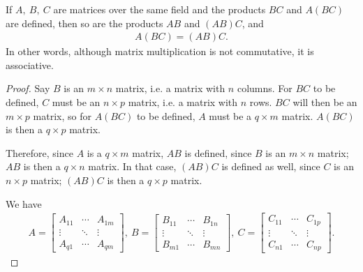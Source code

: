 \documentclass[12pt]{article}
\begin{document}
\begin{thm} \label{thm:matmulassoc}
  If $A,\ B,\ C$ are matrices over the same field and the
  products $BC$ and $A(BC)$ are defined, then so are the products
  $AB$ and $(AB)C$, and
  \begin{align*}
    A(BC) = (AB)C.
  \end{align*}
  In other words, although matrix multiplication is not
  commutative, it is associative.
  \begin{proof}
    Say $B$ is an $m \times n$ matrix, i.e. a matrix with $n$
    columns. For $BC$ to be defined, $C$ must be an $n \times p$
    matrix, i.e. a matrix with $n$ rows. $BC$ will then be an $m
    \times p$ matrix, so for $A(BC)$ to be defined, $A$ must be a
    $q \times m$ matrix. $A(BC)$ is then a $q \times p$ matrix.

    Therefore, since $A$ is a $q \times m$ matrix, $AB$ is
    defined, since $B$ is an $m \times n$ matrix; $AB$ is then a
    $q \times n$ matrix. In that case, $(AB)C$ is defined as
    well, since $C$ is an $n \times p$ matrix; $(AB)C$ is then a
    $q \times p$ matrix.

    We have
    \begin{align*}
      A =
      \begin{bmatrix}
        A_{11}
          & \cdots
          & A_{1m}\\
        \vdots
          & \ddots
          & \vdots\\
        A_{q1}
          & \cdots
          & A_{qm}
      \end{bmatrix},\
      B =
      \begin{bmatrix}
        B_{11}
          & \cdots
          & B_{1n}\\
        \vdots
          & \ddots
          & \vdots\\
        B_{m1}
          & \cdots
          & B_{mn}
      \end{bmatrix},\
      C =
      \begin{bmatrix}
        C_{11}
          & \cdots
          & C_{1p}\\
        \vdots
          & \ddots
          & \vdots\\
        C_{n1}
          & \cdots
          & C_{np}
      \end{bmatrix}.
    \end{align*}


\end{proof}
\end{thm}
\end{document}
